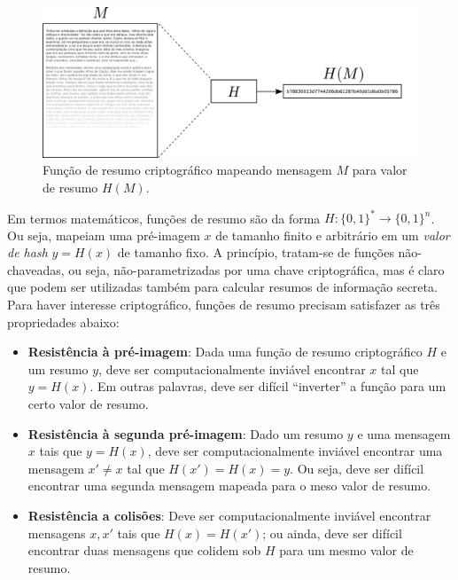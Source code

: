 \begin{figure}[htbp]
\begin{center}
    \includegraphics[scale=0.25]{figures/hash.pdf}
    \caption{Função de resumo criptográfico mapeando mensagem $M$ para valor de resumo $H(M)$.}
    \label{fig:hash}
\end{center}
\end{figure}

Em termos matemáticos, funções de resumo são da forma $H : \{0,1\}^* \rightarrow \{0,1\}^n$. Ou seja, mapeiam uma pré-imagem $x$ de tamanho finito e arbitrário em um \emph{valor de hash} $y = H(x)$ de tamanho fixo. A princípio, tratam-se de funções não-chaveadas, ou seja, não-parametrizadas por uma chave criptográfica, mas é claro que podem ser utilizadas também para calcular resumos de informação secreta. Para haver interesse criptográfico, funções de resumo precisam satisfazer as três propriedades abaixo:

\begin{itemize}
 \item {\bf Resistência à pré-imagem}: Dada uma função de resumo criptográfico $H$ e um resumo $y$, deve ser computacionalmente inviável encontrar $x$ tal que $y = H(x)$. Em outras palavras, deve ser difícil ``inverter'' a função para um certo valor de resumo.
 \item {\bf Resistência à segunda pré-imagem}: Dado um resumo $y$ e uma mensagem $x$ tais que $y = H(x)$, deve ser computacionalmente inviável encontrar uma mensagem $x' \neq x$ tal que $H(x') = H(x) = y$. Ou seja, deve ser difícil encontrar uma segunda mensagem mapeada para o meso valor de resumo.
 \item {\bf Resistência a colisões}: Deve ser computacionalmente inviável encontrar mensagens $x, x'$ tais que $H(x) = H(x')$; ou ainda, deve ser difícil encontrar duas mensagens que colidem sob $H$ para um mesmo valor de resumo.
\end{itemize}

